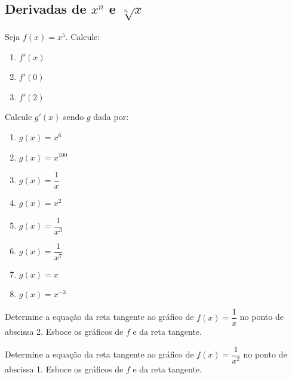 \clearpage

\subsection{Derivadas de $x^n$ e $\sqrt[n]{x}$}

\begin{exercicio}[1]
\label{ex:7.3.1}
Seja $f(x) = x^5$. Calcule:
\begin{enumerate}[label=\alph*)]
    \item $f'(x)$
    \item $f'(0)$
    \item $f'(2)$
\end{enumerate}
\end{exercicio}

\begin{exercicio}[2]
\label{ex:7.3.2}
Calcule $g'(x)$ sendo $g$ dada por:
\begin{enumerate}[label=\alph*)]
    \item $g(x) = x^6$
    \item $g(x) = x^{100}$
    \item $g(x) = \dfrac{1}{x}$
    \item $g(x) = x^2$
    \item $g(x) = \dfrac{1}{x^3}$
    \item $g(x) = \dfrac{1}{x^7}$
    \item $g(x) = x$
    \item $g(x) = x^{-3}$
\end{enumerate}
\end{exercicio}

\begin{exercicio}[3]
\label{ex:7.3.3}
Determine a equação da reta tangente ao gráfico de $f(x) = \dfrac{1}{x}$ no ponto de abscissa 2. Esboce os gráficos de $f$ e da reta tangente.
\end{exercicio}

\begin{exercicio}[4]
\label{ex:7.3.4}
Determine a equação da reta tangente ao gráfico de $f(x) = \dfrac{1}{x^2}$ no ponto de abscissa 1. Esboce os gráficos de $f$ e da reta tangente.
\end{exercicio}

